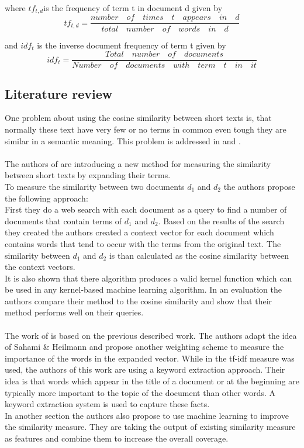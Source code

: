 where $tf_{t,d}$is the  frequency of term t in document d given by
\begin{equation}
tf_{t,d} = \dfrac{number \quad  of \quad  times \quad   t \quad  appears \quad  in \quad   d}{total \quad number  \quad  of \quad  words \quad  in \quad  d}
\end{equation}

and $idf_{t}$ is the inverse document frequency of term t given by
\begin{equation}
idf_{t} = \dfrac{Total \quad number \quad  of  \quad documents}{Number \quad  of \quad  documents \quad  with \quad  term \quad t \quad  in  \quad it}
\end{equation}

\subsection{Literature review}
One problem about using the cosine similarity between short texts is, that normally these text have very few  or no terms in common even tough they are similar in a semantic meaning. This problem is addressed in \cite{Sahami:2006:WKF:1135777.1135834} and \cite{Yih:2007:ISM:1619797.1619884}. \\
~\\
The authors of \cite{Sahami:2006:WKF:1135777.1135834} are introducing a new method for measuring the similarity between short texts by expanding their terms. \\
To measure the similarity between two documents $d_1$ and $d_2$ the authors propose the following approach: \\
First they do a web search with each document as a query to find a number of documents that contain terms of $d_1$ and $d_2$. Based on the results of the search they created the authors created  a context vector for each document which contains words that tend to occur with the terms from the original text. The similarity between $d_1$ and $d_2$ is than calculated as the cosine similarity between the context vectors. \\
It is also shown that there algorithm produces a valid kernel function which can be used in any kernel-based machine learning algorithm. In an evaluation the authors compare their method to the cosine similarity and show that their method performs well on their queries. \\
~\\
The work of \cite{Yih:2007:ISM:1619797.1619884} is based on the previous described work. The authors adapt the idea of Sahami \& Heilmann and propose another weighting scheme to measure the importance of the words in the expanded vector. While in \cite{Sahami:2006:WKF:1135777.1135834} the tf-idf measure was used, the authors of this work are using a keyword extraction approach. Their idea is that words which appear in the title of a document or at the beginning are typically more important to the topic of the document than other words. A keyword extraction system is used to capture these facts. \\
In another section the authors also propose to use machine learning to improve the similarity measure. They are taking the output of existing similarity measure as features and combine them to increase the overall coverage. 


